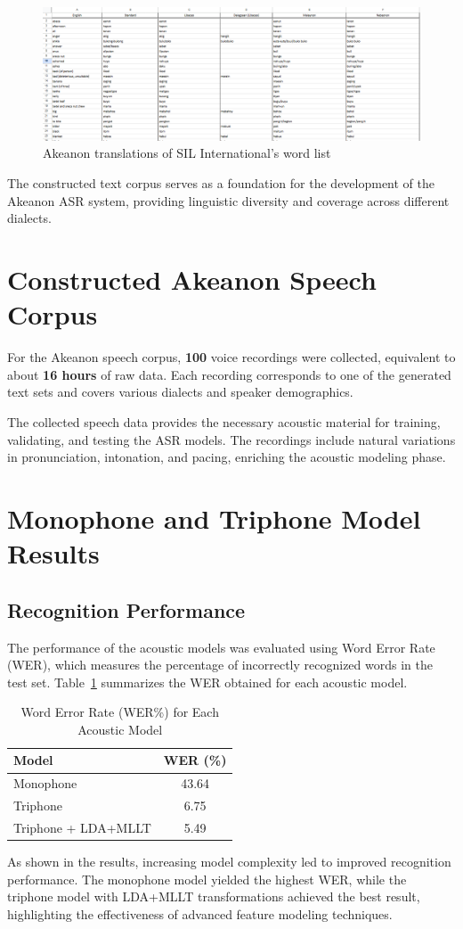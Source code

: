 \begin{figure}[H]
    \centering
    \includegraphics[width=\textwidth]{./figures/SIL.png}
    \caption{Akeanon translations of SIL International's word list}
    \label{fig:sil-list}
\end{figure}

The constructed text corpus serves as a foundation for the development of the Akeanon ASR system, providing linguistic diversity and coverage across different dialects.

\section{Constructed Akeanon Speech Corpus}

For the Akeanon speech corpus, \textbf{100} voice recordings were collected, equivalent to about \textbf{16 hours} of raw data. Each recording corresponds to one of the generated text sets and covers various dialects and speaker demographics.

The collected speech data provides the necessary acoustic material for training, validating, and testing the ASR models. The recordings include natural variations in pronunciation, intonation, and pacing, enriching the acoustic modeling phase.

\section{Monophone and Triphone Model Results}

\subsection{Recognition Performance}

The performance of the acoustic models was evaluated using Word Error Rate (WER), which measures the percentage of incorrectly recognized words in the test set. Table~\ref{tab:wer-results} summarizes the WER obtained for each acoustic model.

\begin{table}[H]
    \centering
    \renewcommand{\arraystretch}{1.3}
    \setlength{\tabcolsep}{16pt}
    \caption{Word Error Rate (WER\%) for Each Acoustic Model}
    \label{tab:wer-results}
    \begin{tabular}{|l|c|}
        \hline
        \textbf{Model} & \textbf{WER (\%)} \\
        \hline
        Monophone & 43.64 \\
        Triphone & 6.75 \\
        Triphone + LDA+MLLT & 5.49 \\
        \hline
    \end{tabular}
\end{table}

As shown in the results, increasing model complexity led to improved recognition performance. The monophone model yielded the highest WER, while the triphone model with LDA+MLLT transformations achieved the best result, highlighting the effectiveness of advanced feature modeling techniques.
